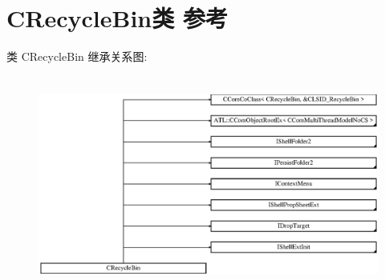 \hypertarget{class_c_recycle_bin}{}\section{C\+Recycle\+Bin类 参考}
\label{class_c_recycle_bin}
类 C\+Recycle\+Bin 继承关系图\+:\begin{figure}[H]
\begin{center}
\leavevmode
\includegraphics[height=7.159091cm]{class_c_recycle_bin}
\end{center}
\end{figure}

